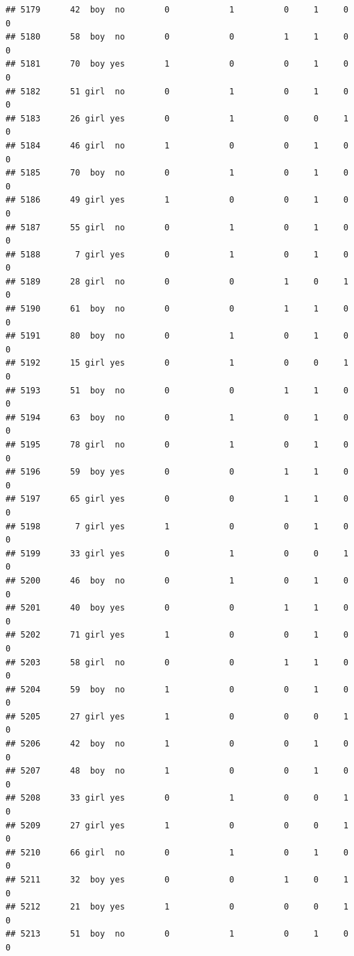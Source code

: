 \documentclass[man]{apa6}
\begin{document}
\begin{verbatim}
## 5179      42  boy  no        0            1          0     1     0     0
## 5180      58  boy  no        0            0          1     1     0     0
## 5181      70  boy yes        1            0          0     1     0     0
## 5182      51 girl  no        0            1          0     1     0     0
## 5183      26 girl yes        0            1          0     0     1     0
## 5184      46 girl  no        1            0          0     1     0     0
## 5185      70  boy  no        0            1          0     1     0     0
## 5186      49 girl yes        1            0          0     1     0     0
## 5187      55 girl  no        0            1          0     1     0     0
## 5188       7 girl yes        0            1          0     1     0     0
## 5189      28 girl  no        0            0          1     0     1     0
## 5190      61  boy  no        0            0          1     1     0     0
## 5191      80  boy  no        0            1          0     1     0     0
## 5192      15 girl yes        0            1          0     0     1     0
## 5193      51  boy  no        0            0          1     1     0     0
## 5194      63  boy  no        0            1          0     1     0     0
## 5195      78 girl  no        0            1          0     1     0     0
## 5196      59  boy yes        0            0          1     1     0     0
## 5197      65 girl yes        0            0          1     1     0     0
## 5198       7 girl yes        1            0          0     1     0     0
## 5199      33 girl yes        0            1          0     0     1     0
## 5200      46  boy  no        0            1          0     1     0     0
## 5201      40  boy yes        0            0          1     1     0     0
## 5202      71 girl yes        1            0          0     1     0     0
## 5203      58 girl  no        0            0          1     1     0     0
## 5204      59  boy  no        1            0          0     1     0     0
## 5205      27 girl yes        1            0          0     0     1     0
## 5206      42  boy  no        1            0          0     1     0     0
## 5207      48  boy  no        1            0          0     1     0     0
## 5208      33 girl yes        0            1          0     0     1     0
## 5209      27 girl yes        1            0          0     0     1     0
## 5210      66 girl  no        0            1          0     1     0     0
## 5211      32  boy yes        0            0          1     0     1     0
## 5212      21  boy yes        1            0          0     0     1     0
## 5213      51  boy  no        0            1          0     1     0     0

\end{verbatim}
\end{document}
